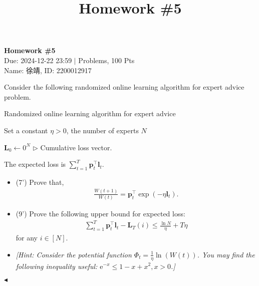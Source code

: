 \documentclass[11pt]{article}
\title{Homework \#5}
\newenvironment{problem}[2][Problem]{\begin{trivlist}
\item[\hskip \labelsep {\bfseries #1}\hskip \labelsep {\bfseries #2.}]}{\hfill$\blacktriangleleft$\end{trivlist}}
\begin{document}
\pagestyle{fancy}
\chead{}

\begin{center}
    {\LARGE \bf Homework \#5}\\
    {Due: 2024-12-22 23:59 \quad$|$ Problems, 100 Pts}\\
    {Name: 徐靖, ID: 2200012917}            %
\end{center}



\begin{problem}{1 (16')} Consider the following randomized online learning algorithm for expert advice problem.
    \begin{algorithm}[htbp]
        \caption{Randomized online learning algorithm for expert advice}
        Set a constant $\eta>0$, the number of experts $N$
    
        $\bm{L}_0\gets 0^N$ \hfill{$\triangleright$ Cumulative loss vector.}
    
    \end{algorithm}
    
    The expected loss is $\sum_{t=1}^T\bm{p}_t^\top\bm{l}_t$. 
    \begin{itemize}
        \item [(1)] (7') Prove that, 
        \begin{align*}
            \frac{W(t+1)}{W(t)}=\bm{p}_t^\top\exp(-\eta\bm{l}_t).
        \end{align*}
        \item [(2)] (9') Prove the following upper bound for expected loss:
        \begin{align*}
            \sum_{t=1}^T\bm{p}_t^\top\bm{l}_t-\bm L_T(i)\leq\frac{\ln N}{\eta}+T\eta
        \end{align*}
        for any $i\in[N]$.
        \item [] \textit{[Hint: Consider the potential function $\Phi_t=\frac{1}{\eta}\ln(W(t))$. You may find the following inequality useful: $\mathrm{e}^{-x}\leq 1-x+x^2,x>0$.]}
    \end{itemize}
    \end{problem}
\end{document}
